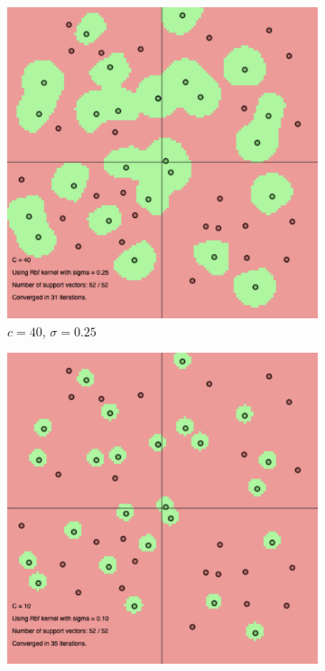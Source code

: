 \documentclass[a4paper, 11pt, one column]{article}
\begin{document}
\begin{figure}
\bigskip
\begin{subfigure}{0.3\textwidth}
   \includegraphics[width=\linewidth]{images/rbf_c_40_s_0.25.png}
   \caption{$c=40$, $\sigma=0.25$} \label{fig:x_d}
\end{subfigure}
\hspace*{\fill}
\begin{subfigure}{0.3\textwidth}
   \includegraphics[width=\linewidth]{images/rbf_c_10_s_0.1.png}

\end{subfigure}
\end{figure}
\end{document}
